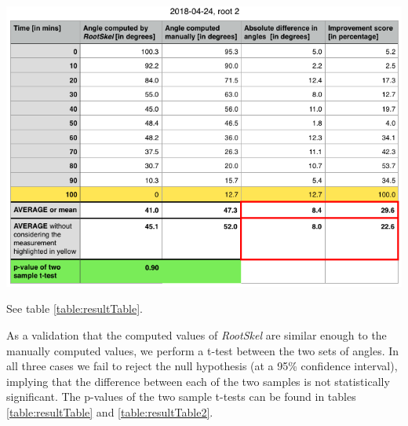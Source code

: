 \begin{table}[H]
	\includegraphics[width=\textwidth]{../Figures/2018-04-24-stats-new.png}
	\caption{See table \ref*{table:resultTable}.}
	\label{table:resultTable2}
\end{table}


As a validation that the computed values of \textit{RootSkel} are similar enough to the manually computed values, we perform a t-test between the two sets of angles.
In all three cases we fail to reject the null hypothesis (at a 95\% confidence interval), implying that the difference between each of the two samples is not statistically significant. The p-values of the two sample t-tests can be found in tables \ref{table:resultTable} and \ref{table:resultTable2}.








%
%



